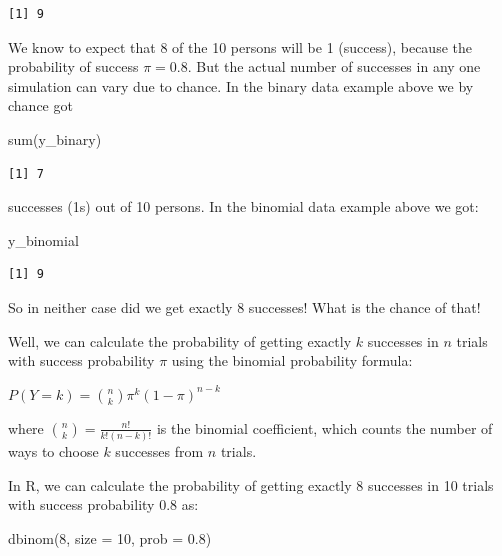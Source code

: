 \documentclass[
  letterpaper,
  8pt,
  a4paper]{book}
\newenvironment{Shaded}{\begin{snugshade}}{\end{snugshade}}
\newcommand{\AttributeTok}[1]{\textcolor[rgb]{0.40,0.45,0.13}{#1}}
\newcommand{\DecValTok}[1]{\textcolor[rgb]{0.68,0.00,0.00}{#1}}
\newcommand{\FloatTok}[1]{\textcolor[rgb]{0.68,0.00,0.00}{#1}}
\newcommand{\FunctionTok}[1]{\textcolor[rgb]{0.28,0.35,0.67}{#1}}
\newcommand{\NormalTok}[1]{\textcolor[rgb]{0.00,0.23,0.31}{#1}}
\begin{document}
\begin{verbatim}
[1] 9
\end{verbatim}

We know to expect that 8 of the 10 persons will be 1 (success), because
the probability of success \(\pi = 0.8\). But the actual number of
successes in any one simulation can vary due to chance. In the binary
data example above we by chance got

\begin{Shaded}
\begin{Highlighting}[]
\FunctionTok{sum}\NormalTok{(y\_binary)}
\end{Highlighting}
\end{Shaded}

\begin{verbatim}
[1] 7
\end{verbatim}

successes (1s) out of 10 persons. In the binomial data example above we
got:

\begin{Shaded}
\begin{Highlighting}[]
\NormalTok{y\_binomial}
\end{Highlighting}
\end{Shaded}

\begin{verbatim}
[1] 9
\end{verbatim}

So in neither case did we get exactly 8 successes! What is the chance of
that!

Well, we can calculate the probability of getting exactly \(k\)
successes in \(n\) trials with success probability \(\pi\) using the
binomial probability formula:

\(P(Y=k) = \binom{n}{k} \pi^k (1-\pi)^{n-k}\)

where \(\binom{n}{k} = \frac{n!}{k!(n-k)!}\) is the binomial
coefficient, which counts the number of ways to choose \(k\) successes
from \(n\) trials.

In R, we can calculate the probability of getting exactly 8 successes in
10 trials with success probability 0.8 as:

\begin{Shaded}
\begin{Highlighting}[]
\FunctionTok{dbinom}\NormalTok{(}\DecValTok{8}\NormalTok{, }\AttributeTok{size =} \DecValTok{10}\NormalTok{, }\AttributeTok{prob =} \FloatTok{0.8}\NormalTok{)}
\end{Highlighting}
\end{Shaded}
\end{document}
